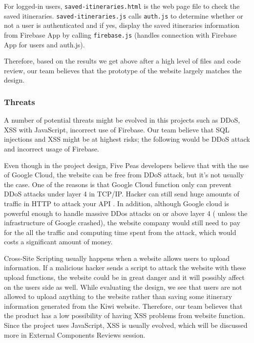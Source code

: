 \documentclass[12pt, a4paper]{article}
\newcommand{\code}[1]{\texttt{#1}}
\begin{document}
For logged-in users, \code{saved-itineraries.html} is the web page file to check the saved itineraries. \code{saved-itineraries.\linebreak[1]js} calls \code{auth.js} to determine whether or not a user is authenticated and if yes, display the saved itineraries information from Firebase App by calling \code{firebase.js} (handles connection with Firebase App for users and auth.js).

Therefore, based on the results we get above after a high level of files and code review, our team believes that the prototype of the website largely matches the design.
\subsubsection{Threats}
A number of potential threats might be evolved in this projects such as DDoS, XSS with JavaScript, incorrect use of Firebase. Our team believe that SQL injections and XSS might be at highest risks; the following would be DDoS attack and incorrect usage of Firebase. 

Even though in the project design, Five Peas developers believe that with the use of Google Cloud, the website can be free from DDoS attack, but it's not usually the case. One of the reasons is that Google Cloud function only can prevent DDoS attacks under layer 4 in TCP/IP. Hacker can still send huge amounts of traffic in HTTP to attack your API \cite{Google-DDoS}. In addition, although Google cloud is powerful enough to handle massive DDos attacks on or above layer 4 ( unless the infrastructure of Google crashed), the website company would still need to pay for the all the traffic and computing time spent from the attack, which would costs a significant amount of money.

Cross-Site Scripting usually happens when a website allows users to upload information. If a malicious hacker sends a script to attack the website with these upload functions, the website could be in great danger and it will possibly affect on the users side as well.
While evaluating the design, we see that users are not allowed to upload anything to the website rather than saving some itinerary information generated from the Kiwi website. Therefore, our team believes that the product has a low possibility of having XSS problems from website function. Since the project uses JavaScript, XSS is usually evolved, which will be discussed more in External Components Reviews session.
\end{document}
